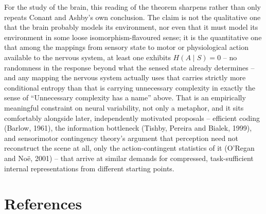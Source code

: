 \documentclass[11pt]{article}
\theoremstyle{definition}
\theoremstyle{remark}
\begin{document}
For the study of the brain, this reading of the theorem sharpens rather
than only repeats Conant and Ashby's own conclusion. The claim is not the
qualitative one that the brain probably models its environment, nor even
that it must model its environment in some loose isomorphism-flavoured
sense; it is the quantitative one that among the mappings from sensory
state to motor or physiological action available to the nervous system,
at least one exhibits $H(A\mid S)=0$ -- no randomness in the response
beyond what the sensed state already determines -- and any mapping the
nervous system actually uses that carries strictly more conditional
entropy than that is carrying unnecessary complexity in exactly the sense
of ``Unnecessary complexity has a name'' above. That is an empirically
meaningful constraint on neural variability, not only a metaphor, and it
sits comfortably alongside later,
independently motivated proposals -- efficient coding (Barlow, 1961), the
information bottleneck (Tishby, Pereira and Bialek, 1999), and
sensorimotor contingency theory's argument that perception need not
reconstruct the scene at all, only the action-contingent statistics of it
(O'Regan and No\"e, 2001) -- that arrive at similar demands for
compressed, task-sufficient internal representations from different
starting points.

\section*{References}
\end{document}
